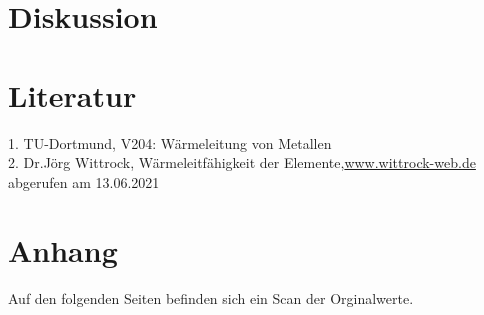 \section{Diskussion}

\section{Literatur}
1. TU-Dortmund, V204: Wärmeleitung von Metallen\\
2. Dr.Jörg Wittrock, Wärmeleitfähigkeit der Elemente,\hyperlink{http://www.wittrock-web.de/pse_leit_th.html}{www.wittrock-web.de} abgerufen am 13.06.2021
\section{Anhang}
Auf den folgenden Seiten befinden sich ein Scan der Orginalwerte.